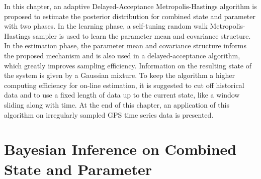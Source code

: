 In this chapter, an adaptive Delayed-Acceptance Metropolis-Hastings algorithm is proposed to estimate the posterior distribution for combined state and parameter with two phases. In the learning phase, a self-tuning random walk Metropolis-Hastings sampler is used to learn the parameter mean and covariance structure. In the estimation phase, the parameter mean and covariance structure informs the proposed mechanism and is also used in a delayed-acceptance algorithm, which greatly improves sampling efficiency. Information on the resulting state of the system is given by a Gaussian mixture. To keep the algorithm a higher computing efficiency for on-line estimation, it is suggested to cut off historical data and to use a fixed length of data up to the current state, like a window sliding along with time. At the end of this chapter, an application of this algorithm on irregularly sampled GPS time series data is presented. 

%



\section{Bayesian Inference on Combined State and Parameter}

